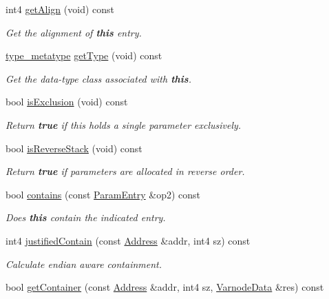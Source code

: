 \begin{DoxyCompactItemize}
int4 \mbox{\hyperlink{class_param_entry_a7366c85d2d63bc5a2495d8597b1f977a}{get\+Align}} (void) const
\begin{DoxyCompactList}\small\item\em Get the alignment of {\bfseries{this}} entry. \end{DoxyCompactList}\item 
\mbox{\hyperlink{type_8hh_aef6429f2523cdf4d415ba04a0209e61f}{type\+\_\+metatype}} \mbox{\hyperlink{class_param_entry_aeb33e71b09562418a0a2a88650d6403a}{get\+Type}} (void) const
\begin{DoxyCompactList}\small\item\em Get the data-\/type class associated with {\bfseries{this}}. \end{DoxyCompactList}\item 
bool \mbox{\hyperlink{class_param_entry_a1c72a43ac9238f9fae35f38b88ef2010}{is\+Exclusion}} (void) const
\begin{DoxyCompactList}\small\item\em Return {\bfseries{true}} if this holds a single parameter exclusively. \end{DoxyCompactList}\item 
bool \mbox{\hyperlink{class_param_entry_a9bacf2dac015159e70a62bb611abe0f4}{is\+Reverse\+Stack}} (void) const
\begin{DoxyCompactList}\small\item\em Return {\bfseries{true}} if parameters are allocated in reverse order. \end{DoxyCompactList}\item 
bool \mbox{\hyperlink{class_param_entry_a57be6dd1ea538a557fa636e53b392618}{contains}} (const \mbox{\hyperlink{class_param_entry}{Param\+Entry}} \&op2) const
\begin{DoxyCompactList}\small\item\em Does {\bfseries{this}} contain the indicated entry. \end{DoxyCompactList}\item 
int4 \mbox{\hyperlink{class_param_entry_ad2394315fdaceeb41f3b67f31f0ef01e}{justified\+Contain}} (const \mbox{\hyperlink{class_address}{Address}} \&addr, int4 sz) const
\begin{DoxyCompactList}\small\item\em Calculate endian aware containment. \end{DoxyCompactList}\item 
bool \mbox{\hyperlink{class_param_entry_a8725ae536c3a2eb5747df143eee4a552}{get\+Container}} (const \mbox{\hyperlink{class_address}{Address}} \&addr, int4 sz, \mbox{\hyperlink{struct_varnode_data}{Varnode\+Data}} \&res) const

\end{DoxyCompactItemize}
